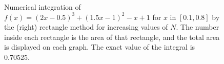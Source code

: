 \begin{figure}
  \centering
  \caption{Numerical integration of $f(x) = (2 x-0.5)^3+(1.5 x-1)^2-x+1$ for $x$ in $[0.1,0.8]$
    by the (right) rectangle method for increasing values of $N$. The number inside each rectangle is
    the area of that rectangle, and the total area is displayed on each graph.
  The exact value of the integral is 0.70525.}\label{fig:rectangle}
\end{figure}

